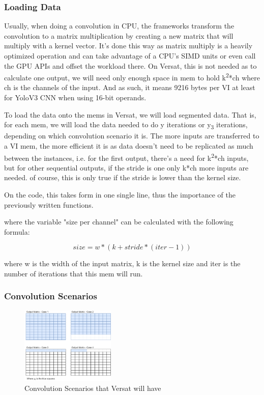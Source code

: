 \documentclass[conference]{IEEEtran}
\begin{document}
\subsubsection{Loading Data}

Usually, when doing a convolution in CPU, the frameworks transform the convolution to a matrix multiplication by creating a new matrix that will multiply with a
kernel vector. It's done this way as matrix multiply is a heavily optimized operation and can take advantage of a CPU's SIMD units or even call the GPU APIs
and offset the workload there. On Versat, this is not needed as to calculate one output, we will need only enough space in mem to hold
k\textsuperscript{2}*ch where ch is the channels of the input. And as such, it means 9216 bytes per VI at least for YoloV3 CNN when using 16-bit operands.

To load the data onto the mems in Versat, we will load segmented data. That is, for each mem, we will load the data
needed to do y iterations or y\textsubscript{3} iterations, depending on which convolution scenario it is.
The more inputs are transferred to a VI mem, the more efficient it is as data doesn't need to be replicated as much between the instances,
i.e. for the first output, there's a need for k\textsuperscript{2}*ch inputs, but for other sequential outputs, if the stride is one only k*ch more inputs are needed.
of course, this is only true if the stride is lower than the kernel size.

On the code, this takes form in one single line, thus the importance of the previously written functions.



where the variable "size per channel" can be calculated with the following formula:

\[ size=w*(k+stride*(iter-1)) \]

where w is the width of the input matrix, k is the kernel size and iter is the number of iterations that this mem will run.

\subsubsection{Convolution Scenarios}
\label{ConvolutionScenarios}

\begin{figure}[!htbp]
    \centering
    \includegraphics[width=0.4\textwidth]{Figures/Variables.drawio.png}
    \caption{Convolution Scenarios that Versat will have}
    \label{ConvScenarioss}
\end{figure}
\end{document}
